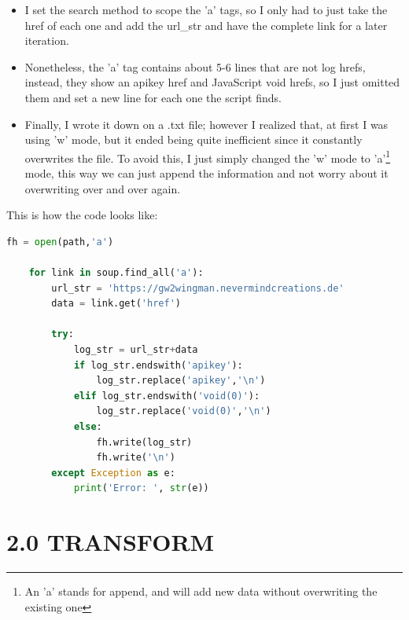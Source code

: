 \documentclass[12pt,a4paper]{article}
\begin{document}
    \begin{itemize}

        \item I set the search method to scope the 'a' tags, so I only had to just take the href of each one and 
        add the url\_str and have the complete link for a later iteration.

        \item Nonetheless, the 'a' tag contains about 5-6 lines that are not log hrefs, instead, they show an apikey 
        href and JavaScript void hrefs, so I just omitted them and set a new line for each one the script finds.

        \newpage

        \item Finally, I wrote it down on a .txt file; however I realized that, at first I was using 'w' mode, but it 
        ended being quite inefficient since it constantly overwrites the file. To avoid this, I just simply changed 
        the 'w' mode to 'a'\footnote{An 'a' stands for append, and will add new data without overwriting the existing one}
        mode, this way we can just append the information and not worry about it overwriting over and over again.

    \end{itemize}

    This is how the code looks like:

    \begin{lstlisting}[language=Python]
    fh = open(path,'a')

    for link in soup.find_all('a'):
        url_str = 'https://gw2wingman.nevermindcreations.de'
        data = link.get('href')
        
        try:
            log_str = url_str+data
            if log_str.endswith('apikey'):
                log_str.replace('apikey','\n')
            elif log_str.endswith('void(0)'):
                log_str.replace('void(0)','\n')
            else:
                fh.write(log_str)
                fh.write('\n')
        except Exception as e:
            print('Error: ', str(e))
    \end{lstlisting}

    \newpage

    \section*{2.0 TRANSFORM}
\end{document}
